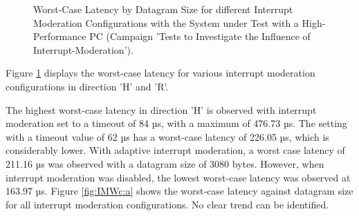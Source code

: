 \begin{figure}[h!]
  \centering
  \caption{Worst-Case Latency by Datagram Size for different Interrupt Moderation Configurations with the System under Test with a High-Performance PC (Campaign 'Tests to Investigate the Influence of Interrupt-Moderation').}
  \label{fig:IMWc}
\end{figure}

Figure \ref{fig:IMWc} displays the worst-case latency for various interrupt moderation configurations in direction 'H' and 'R'.

The highest worst-case latency in direction 'H' is observed with interrupt moderation set to a timeout of 84 µs, with a maximum of 476.73 µs. The setting with a timeout value of 62 µs has a worst-case latency of 226.05 µs, which is considerably lower. With adaptive interrupt moderation, a worst case latency of 211.16 µs was observed with a datagram size of 3080 bytes. However, when interrupt moderation was disabled, the lowest worst-case latency was observed at 163.97 µs. Figure \ref{fig:IMWc:a} shows the worst-case latency against datagram size for all interrupt moderation configurations. No clear trend can be identified.


